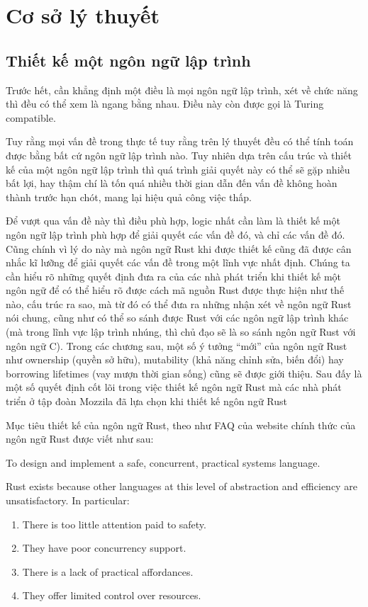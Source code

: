 \chapter{Cơ sở lý thuyết}\label{ch2-top}
\section{Thiết kế một ngôn ngữ lập trình}
Trước hết, cần khẳng định một điều là mọi ngôn ngữ lập trình, xét về chức năng thì đều có thể xem là ngang bằng nhau.
Điều này còn được gọi là Turing compatible.

Tuy rằng mọi vấn đề trong thực tế tuy rằng trên lý thuyết đều có thể tính toán được bằng bất cứ ngôn ngữ lập trình nào.
Tuy nhiên dựa trên cấu trúc và thiết kế của một ngôn ngữ lập trình thì quá trình giải quyết này có thể sẽ gặp nhiều bất lợi, hay thậm chí là tốn quá nhiều thời gian dẫn đến vấn đề không hoàn thành trước hạn chót, mang lại hiệu quả công việc thấp.

Để vượt qua vấn đề này thì điều phù hợp, logic nhất cần làm là thiết kế một ngôn ngữ lập trình phù hợp để giải quyết các vấn đề đó, và chỉ các vấn đề đó.
Cũng chính vì lý do này mà ngôn ngữ Rust khi được thiết kế cũng đã được cân nhắc kĩ lưỡng để giải quyết các vấn đề trong một lĩnh vực nhất định.
Chúng ta cần hiểu rõ những quyết định đưa ra của các nhà phát triển khi thiết kế một ngôn ngữ để có thể hiểu rõ được cách mã nguồn Rust được thực hiện như thế nào, cấu trúc ra sao, mà từ đó có thể đưa ra những nhận xét về ngôn ngữ Rust nói chung, cũng như có thể so sánh được Rust với các ngôn ngữ lập trình khác (mà trong lĩnh vực lập trình nhúng, thì chủ đạo sẽ là so sánh ngôn ngữ Rust với ngôn ngữ C).
Trong các chương sau, một số ý tưởng ``mới'' của ngôn ngữ Rust như ownership (quyền sở hữu), mutability (khả năng chỉnh sửa, biến đổi) hay borrowing lifetimes (vay mượn thời gian sống) cũng sẽ được giới thiệu.
Sau đấy là một số quyết định cốt lõi trong việc thiết kế ngôn ngữ Rust mà các nhà phát triển ở tập đoàn Mozzila đã lựa chọn khi thiết kế ngôn ngữ Rust \cite{rust_website}

Mục tiêu thiết kế của ngôn ngữ Rust, theo như FAQ của website chính thức của ngôn ngữ Rust được viết như sau:
\bigskip

To design and implement a safe, concurrent, practical systems language.

Rust exists because other languages at this level of abstraction and efficiency are unsatisfactory. In particular:

\begin{enumerate}
\item There is too little attention paid to safety.
\item They have poor concurrency support.
\item There is a lack of practical affordances.
\item They offer limited control over resources.
\end{enumerate}

